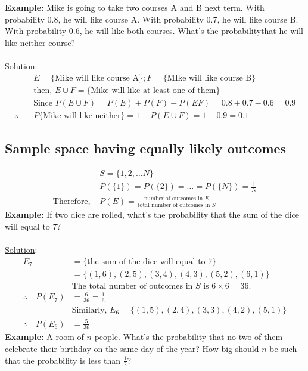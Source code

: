 \documentclass[11pt, letterpaper]{article}
\begin{document}
\noindent
\textbf{Example: } Mike is going to take two courses A and B next term. With probability 0.8, he will like course A. With probability 0.7, he will like course B. With probability 0.6, he will like both courses. What's the probabilitythat he will like neither course? \\ \\
\noindent
\underline{Solution}:
\begin{align*}
  &E = \{ \text{Mike will like course A} \}; F = \{ \text{MIke will like course B} \} \\
  &\text{then, } E \cup F = \{ \text{Mike will like at least one of them} \} \\
  &\text{Since } P(E \cup F) = P(E) + P(F) - P(EF)  = 0.8 + 0.7 -0.6 = 0.9 \\
  \therefore \quad &P\{ \text{Mike will like neither} \} = 1 - P(E \cup F) = 1 - 0.9 = 0.1
\end{align*}
\subsection{Sample space having equally likely outcomes}
\begin{align*}
  &S = \{1,2, \dots N \} \\
  &P(\{1\}) = P(\{2\}) = \dots = P(\{N\}) = \frac{1}{N} \\
  \text{Therefore, } &P(E) = \frac{\text{number of outcomes in } E}{\text{total number of outcomes in } S}
\end{align*}
\textbf{Example: } If two dice are rolled, what's the probability that the sum of the dice will equal to 7? \\ \\
\noindent
\underline{Solution}:
\begin{align*}
  E_7 &= \{\text{the sum of the dice will equal to 7}\} \\
  &= \{ (1,6), (2,5), (3,4), (4,3), (5,2), (6,1) \} \\
  &\text{The total number of outcomes in $S$ is $6\times6 = 36$.} \\
  \therefore \quad P(E_7) &= \frac{6}{36} = \frac{1}{6} \\
  &\text{Similarly, } E_6 = \{(1,5), (2,4), (3,3), (4,2), (5,1)\} \\
  \therefore \quad P(E_6) &= \frac{5}{36}
\end{align*}
\noindent
\textbf{Example: } A room of $n$ people. What's the probability that no two of them celebrate their birthday on the same day of the year? How big should $n$ be such that the probability is less than $\frac{1}{2}$? \clearpage
\end{document}
